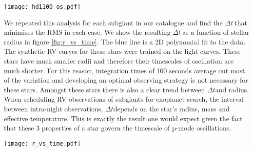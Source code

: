 \documentclass[useAMS, usenatbib]{aastex}
\newcommand{\dt}{$\Delta t$}
\begin{document}
\begin{figure*}
\begin{center}
\texttt{[image: hd1100\_os.pdf]}
\caption{{\it (Top)} Synthetic 10 day RV curve for HD1100, a 1.255$\pm$0.12
M$_\odot$, 5.47$\pm$0.667 R$_\odot$ subgiant. {\it(Bottom)} RMS vs \dt. The
faint orange lines show the variation in RMS as a function of \dt$~$for a range
of starting times. The solid orange line shows the mean of these lines. The
solid orange line shows the effect of marginalising over the starting times.}
\label{fig:os}
\end{center}
\end{figure*}

We repeated  this analysis for each subgiant in our catalogue and find the
\dt$~$that minimises the RMS in each case.
We show the resulting \dt$~$as a function of stellar radius in figure
\ref{fig:r_vs_time}.
The blue line is a 2D polynomial fit to the data.
The synthetic RV curves for these stars were trained on the light curves.
These stars have much smaller radii and therefore their timescales of
oscillation are much shorter.
For this reason, integration times of 100 seconds average out most of the
variation and developing an optimal observing strategy is not necessary for
these stars.
Amongst these stars there is also a clear trend between \dt and radius.
When scheduling RV observations of subgiants for exoplanet search, the interval
between intra-night observations, \dt depends on the star's radius, mass and
effective temperature.
This is exactly the result one would expect given the fact that these
3 properties of a star govern the timescale of p-mode oscillations.

\begin{figure*}
\begin{center}
\texttt{[image: r\_vs\_time.pdf]}
\caption{Radius vs \dt. This plot shows how the optimal observing interval,
\dt, varies as a function of subgiant radius. The blue line is a 2D polynomial
fit to the data.}
\label{fig:r_vs_time}
\end{center}
\end{figure*}

\end{document}
